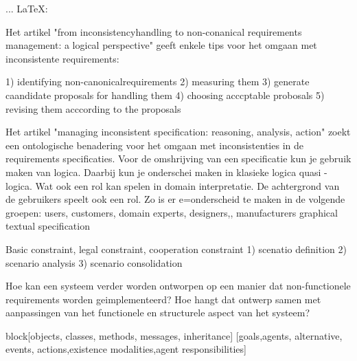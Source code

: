   ... \LaTeX:\\ \url{}
 
 Het artikel "from inconsistencyhandling to non-conanical requirements management: a logical perspective" geeft enkele tips voor het omgaan met inconsistente requirements:
 
 1) identifying non-canonicalrequirements
 2) measuring them
 3) generate caandidate proposals for handling them
 4) choosing acccptable probosals
 5) revising them acccording to the proposals

Het artikel "managing inconsistent specification: reasoning, analysis, action" zoekt een ontologische benadering voor het omgaan met inconsistenties in de requirements specificaties.
Voor de omshrijving van een specificatie kun je gebruik maken van logica. Daarbij kun je onderschei maken in klasieke logica quasi -logica.
Wat ook een rol kan spelen in domain interpretatie. De achtergrond van de gebruikers speelt ook een rol.
Zo is er e=onderscheid te maken in de volgende groepen: users, customers, domain experts, designers,, manufacturers
graphical  textual specification

Basic constraint, legal constraint, cooperation constraint
1) scenatio  definition
2) scenario analysis
3) scenario consolidation


Hoe kan een systeem verder worden ontworpen op een manier dat non-functionele requirements worden geimplementeerd?
Hoe hangt dat ontwerp samen met aanpassingen van het functionele en structurele aspect van het systeem?

block[objects, classes, methods, messages, inheritance]
[goals,agents, alternative, events, actions,existence modalities,agent responsibilities]


